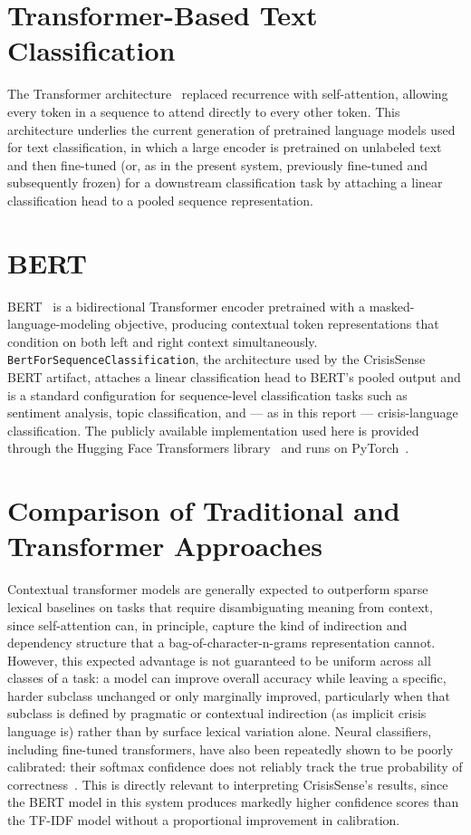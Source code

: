 \section{Transformer-Based Text Classification}

The Transformer architecture~\cite{vaswani2017attention} replaced recurrence with self-attention, allowing every token in a sequence to attend directly to every other token. This architecture underlies the current generation of pretrained language models used for text classification, in which a large encoder is pretrained on unlabeled text and then fine-tuned (or, as in the present system, previously fine-tuned and subsequently frozen) for a downstream classification task by attaching a linear classification head to a pooled sequence representation.

\section{BERT}

BERT~\cite{devlin2019bert} is a bidirectional Transformer encoder pretrained with a masked-language-modeling objective, producing contextual token representations that condition on both left and right context simultaneously. \texttt{BertForSequenceClassification}, the architecture used by the CrisisSense BERT artifact, attaches a linear classification head to BERT's pooled output and is a standard configuration for sequence-level classification tasks such as sentiment analysis, topic classification, and --- as in this report --- crisis-language classification. The publicly available implementation used here is provided through the Hugging Face Transformers library~\cite{wolf2020transformers} and runs on PyTorch~\cite{paszke2019pytorch}.

\section{Comparison of Traditional and Transformer Approaches}

Contextual transformer models are generally expected to outperform sparse lexical baselines on tasks that require disambiguating meaning from context, since self-attention can, in principle, capture the kind of indirection and dependency structure that a bag-of-character-n-grams representation cannot. However, this expected advantage is not guaranteed to be uniform across all classes of a task: a model can improve overall accuracy while leaving a specific, harder subclass unchanged or only marginally improved, particularly when that subclass is defined by pragmatic or contextual indirection (as implicit crisis language is) rather than by surface lexical variation alone. Neural classifiers, including fine-tuned transformers, have also been repeatedly shown to be poorly calibrated: their softmax confidence does not reliably track the true probability of correctness~\cite{guo2017calibration,naeini2015obtaining}. This is directly relevant to interpreting CrisisSense's results, since the BERT model in this system produces markedly higher confidence scores than the TF-IDF model without a proportional improvement in calibration.

